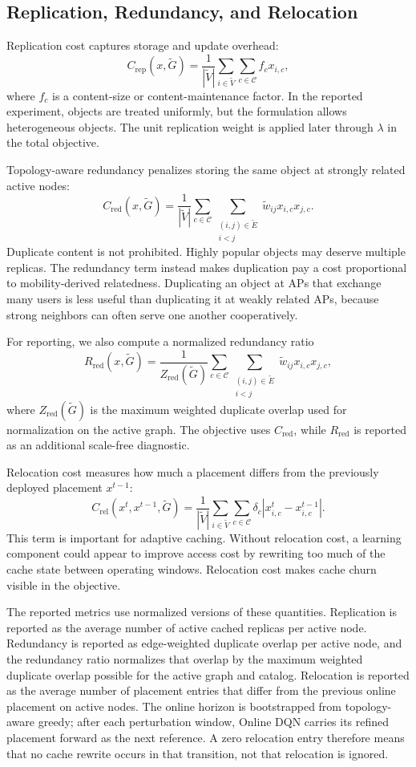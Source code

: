 \subsection{Replication, Redundancy, and Relocation}

Replication cost captures storage and update overhead:
\[
C_{\text{rep}}(x,\tilde{G})
=
\frac{1}{|\tilde{V}|}
\sum_{i \in \tilde{V}}\sum_{c \in \mathcal{C}}
f_c x_{i,c},
\]
where \(f_c\) is a content-size or content-maintenance factor. In the reported experiment, objects are treated uniformly, but the formulation allows heterogeneous objects. The unit replication weight is applied later through \(\lambda\) in the total objective.

Topology-aware redundancy penalizes storing the same object at strongly related active nodes:
\[
C_{\text{red}}(x,\tilde{G})
=
\frac{1}{|\tilde{V}|}
\sum_{c \in \mathcal{C}}\sum_{\substack{(i,j)\in\tilde{E}\\i<j}}
\tilde{w}_{ij}x_{i,c}x_{j,c}.
\]
Duplicate content is not prohibited. Highly popular objects may deserve multiple replicas. The redundancy term instead makes duplication pay a cost proportional to mobility-derived relatedness. Duplicating an object at APs that exchange many users is less useful than duplicating it at weakly related APs, because strong neighbors can often serve one another cooperatively.

For reporting, we also compute a normalized redundancy ratio
\[
R_{\text{red}}(x,\tilde{G})
=
\frac{1}{Z_{\text{red}}(\tilde{G})}
\sum_{c \in \mathcal{C}}\sum_{\substack{(i,j)\in\tilde{E}\\i<j}}
\tilde{w}_{ij}x_{i,c}x_{j,c},
\]
where \(Z_{\text{red}}(\tilde{G})\) is the maximum weighted duplicate overlap used for normalization on the active graph. The objective uses \(C_{\text{red}}\), while \(R_{\text{red}}\) is reported as an additional scale-free diagnostic.

Relocation cost measures how much a placement differs from the previously deployed placement \(x^{t-1}\):
\[
C_{\text{rel}}(x^t,x^{t-1},\tilde{G})
=
\frac{1}{|\tilde{V}|}
\sum_{i \in \tilde{V}}\sum_{c \in \mathcal{C}}
\delta_c |x^t_{i,c}-x^{t-1}_{i,c}|.
\]
This term is important for adaptive caching. Without relocation cost, a learning component could appear to improve access cost by rewriting too much of the cache state between operating windows. Relocation cost makes cache churn visible in the objective.

The reported metrics use normalized versions of these quantities. Replication is reported as the average number of active cached replicas per active node. Redundancy is reported as edge-weighted duplicate overlap per active node, and the redundancy ratio normalizes that overlap by the maximum weighted duplicate overlap possible for the active graph and catalog. Relocation is reported as the average number of placement entries that differ from the previous online placement on active nodes. The online horizon is bootstrapped from topology-aware greedy; after each perturbation window, Online DQN carries its refined placement forward as the next reference. A zero relocation entry therefore means that no cache rewrite occurs in that transition, not that relocation is ignored.

